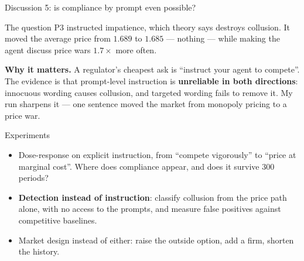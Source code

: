 \documentclass[aspectratio=169,9pt]{beamer}
\newcommand{\orange}[1]{\textcolor{AmazonOrange}{\textbf{#1}}}
\newcommand{\blue}[1]{\textcolor{densityblue}{\textbf{#1}}}
\begin{document}
\begin{frame}{Discussion 5: is compliance by prompt even possible?}
\begin{block}{The question}
P3 instructed impatience, which theory says destroys collusion. It moved the average price from $1.689$ to
$1.685$ --- nothing --- while making the agent discuss price wars $1.7\times$ more often.
\end{block}
\pause
\vspace{0.1cm}
\textbf{Why it matters.} A regulator's cheapest ask is ``instruct your agent to compete''. The evidence is that
prompt-level instruction is \orange{unreliable in both directions}: innocuous wording causes collusion, and
targeted wording fails to remove it. My run sharpens it --- one sentence moved the market from monopoly pricing
to a price war.
\pause
\vspace{0.1cm}
\begin{block}{Experiments}
\begin{itemize}
    \item Dose-response on explicit instruction, from ``compete vigorously'' to ``price at marginal cost''.
    Where does compliance appear, and does it survive $300$ periods?
    \item \blue{Detection instead of instruction}: classify collusion from the price path alone, with no access
    to the prompts, and measure false positives against competitive baselines.
    \item Market design instead of either: raise the outside option, add a firm, shorten the history.
\end{itemize}
\end{block}
\end{frame}
\end{document}
